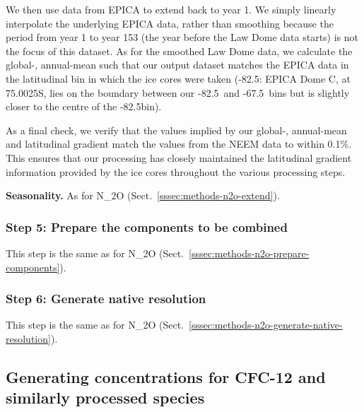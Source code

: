 We then use data from EPICA \citep{epica_edml-ch4_2006} to extend back to year 1.
We simply linearly interpolate the underlying EPICA data,
rather than smoothing because the period from year 1 to year 153
(the year before the Law Dome data starts)
is not the focus of this dataset.
As for the smoothed Law Dome data,
we calculate the global-, annual-mean such that our output dataset matches the EPICA data
in the latitudinal bin in which the ice cores were taken
(-82.5\textdegree: EPICA Dome C, at 75.0025\textdegree S,
lies on the boundary between our -82.5\textdegree~and -67.5\textdegree~bins
but is slightly closer to the centre of the -82.5\textdegree bin).

As a final check, we verify that the values implied by our global-, annual-mean and latitudinal gradient
match the values from the NEEM data to within 0.1\%.
This ensures that our processing has closely maintained the latitudinal gradient information
provided by the ice cores throughout the various processing steps.

\textbf{Seasonality.}
As for N_2O (Sect.~\ref{sssec:methods-n2o-extend}).

\subsubsection{Step 5: Prepare the components to be combined}
\label{sssec:methods-ch4-prepare-components}

This step is the same as for N_2O (Sect.~\ref{sssec:methods-n2o-prepare-components}).

\subsubsection{Step 6: Generate native resolution}
\label{sssec:methods-ch4-generate-native-resolution}

This step is the same as for N_2O (Sect.~\ref{sssec:methods-n2o-generate-native-resolution}).

\subsection{Generating concentrations for CFC-12 and similarly processed species}
\label{ssec:methods-cfc12-like}

